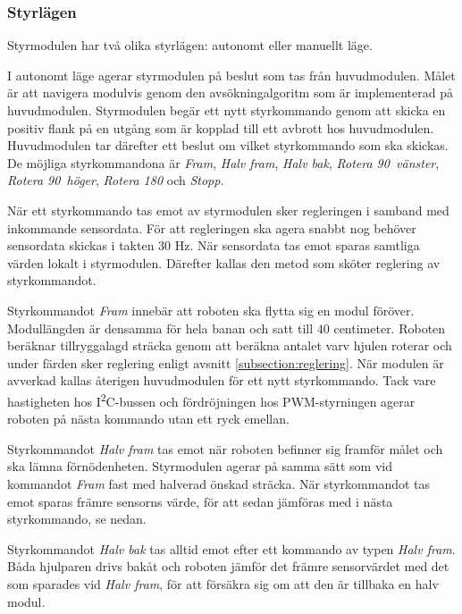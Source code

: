 \documentclass[11pt]{article}
\begin{document}
\begin{flushleft}
\subsubsection{Styrlägen}
Styrmodulen har två olika styrlägen: autonomt eller manuellt läge.
\begin{description}[style=unboxed, leftmargin=0cm]
  \item[Autonomt läge]
    I autonomt läge agerar styrmodulen på beslut som tas från huvudmodulen. Målet är att navigera modulvis genom den avsökningalgoritm som är implementerad på huvudmodulen. Styrmodulen begär ett nytt styrkommando genom att skicka en positiv flank på en utgång som är kopplad till ett avbrott hos huvudmodulen. Huvudmodulen tar därefter ett beslut om vilket styrkommando som ska skickas. De möjliga styrkommandona är \textit{Fram}, \textit{Halv fram}, \textit{Halv bak}, \textit{Rotera 90\textdegree\ vänster}, \textit{Rotera 90\textdegree\ höger}, \textit{Rotera 180\textdegree} och \textit{Stopp}. 

När ett styrkommando tas emot av styrmodulen sker regleringen i samband med inkommande sensordata. För att regleringen ska agera snabbt nog behöver sensordata skickas i takten $30$ Hz. När sensordata tas emot sparas samtliga värden lokalt i styrmodulen. Därefter kallas den metod som sköter reglering av styrkommandot. 

Styrkommandot \textit{Fram} innebär att roboten ska flytta sig en modul föröver. Modullängden är densamma för hela banan och satt till $40$ centimeter. Roboten beräknar tillryggalagd sträcka genom att beräkna antalet varv hjulen roterar och under färden sker reglering enligt avsnitt \ref{subsection:reglering}. När modulen är avverkad kallas återigen huvudmodulen för ett nytt styrkommando. Tack vare hastigheten hos I\textsuperscript{2}C-bussen och fördröjningen hos PWM-styrningen agerar roboten på nästa kommando utan ett ryck emellan. 

Styrkommandot \textit{Halv fram} tas emot när roboten befinner sig framför målet och ska lämna förnödenheten. Styrmodulen agerar på samma sätt som vid kommandot \textit{Fram} fast med halverad önskad sträcka. När styrkommandot tas emot sparas främre sensorns värde, för att sedan jämföras med i nästa styrkommando, se nedan.

Styrkommandot \textit{Halv bak} tas alltid emot efter ett kommando av typen \textit{Halv fram}. Båda hjulparen drivs bakåt och roboten jämför det främre sensorvärdet med det som sparades vid \textit{Halv fram}, för att försäkra sig om att den är tillbaka en halv modul. 


\end{description}
\end{flushleft}
\end{document}
